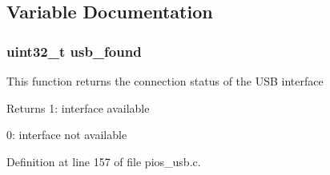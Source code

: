\subsection{\-Variable \-Documentation}
\hypertarget{group___p_i_o_s___u_s_b_ga2a91e3a5ac99b2ec7e0025c14ea0a34d}{
\subsubsection[{usb\-\_\-found}]{\setlength{\rightskip}{0pt plus 5cm}uint32\-\_\-t {\bf usb\-\_\-found}}}\label{group___p_i_o_s___u_s_b_ga2a91e3a5ac99b2ec7e0025c14ea0a34d}
\-This function returns the connection status of the \-U\-S\-B interface \begin{DoxyReturn}{\-Returns}
1\-: interface available 

0\-: interface not available 
\end{DoxyReturn}


\-Definition at line 157 of file pios\-\_\-usb.\-c.

